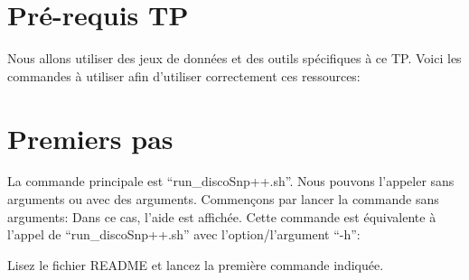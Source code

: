 
\section*{Pré-requis TP}
Nous allons utiliser des jeux de données et des outils spécifiques à ce TP. Voici les commandes à utiliser afin d'utiliser correctement ces ressources:






\section*{Premiers pas}
La commande principale est ``run\_discoSnp++.sh''. Nous pouvons l'appeler sans arguments ou avec des arguments. Commençons par lancer la commande sans arguments:
Dans ce cas, l'aide est affichée. Cette commande est équivalente à l'appel de ``run\_discoSnp++.sh'' avec l'option/l'argument ``-h'':




\qu Lisez le fichier README et lancez la première commande indiquée.

